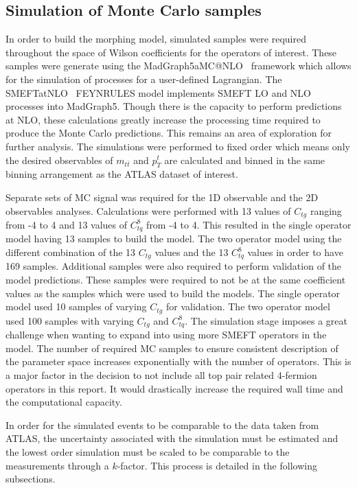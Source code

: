 \documentclass[a4paper,11pt]{article}
\begin{document}
\subsection{Simulation of Monte Carlo samples}
In order to build the morphing model, simulated samples were required throughout the space of Wilson coefficients for the operators of interest.
These samples were generate using the MadGraph5\textunderscore aMC@NLO~\cite{Alwall_2014} framework which allows for the simulation of processes for a user-defined Lagrangian.
The SMEFTatNLO~\cite{degrande2020automated} FEYNRULES model implements SMEFT LO and NLO processes into MadGraph5.
Though there is the capacity to perform predictions at NLO, these calculations greatly increase the processing time required to produce the Monte Carlo predictions.
This remains an area of exploration for further analysis.
The simulations were performed to fixed order which means only the desired observables of $m_{t\bar{t}}$ and ${p_{T}^{t}}$ are calculated and binned in the same binning arrangement as the ATLAS dataset of interest.

Separate sets of MC signal was required for the 1D observable and the 2D observables analyses.
Calculations were performed with 13 values of $C_{tg}$ ranging from -4 to 4 and 13 values of $C_{tq}^{8}$ from -4 to 4.
This resulted in the single operator model having 13 samples to build the model.
The two operator model using the different combination of the 13 $C_{tg}$ values and the 13 $C_{tq}^{8}$ values in order to have 169 samples.
Additional samples were also required to perform validation of the model predictions.
These samples were required to not be at the same coefficient values as the samples which were used to build the models.
The single operator model used 10 samples of varying $C_{tg}$ for validation.
The two operator model used 100 samples with varying $C_{tg}$ and $C_{tq}^{8}$.
The simulation stage imposes a great challenge when wanting to expand into using more SMEFT operators in the model.
The number of required MC samples to ensure consistent description of the parameter space increases exponentially with the number of operators.
This is a major factor in the decision to not include all top pair related 4-fermion operators in this report.
It would drastically increase the required wall time and the computational capacity.

In order for the simulated events to be comparable to the data taken from ATLAS, the uncertainty associated with the simulation must be estimated and the lowest order simulation must be scaled to be comparable to the measurements through a $k$-factor.
This process is detailed in the following subsections.
\end{document}
